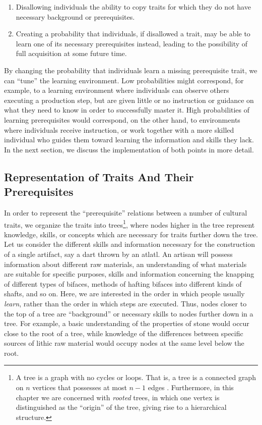 \documentclass[graybox,natbib]{svmult}
\begin{document}
\begin{enumerate}
\def\labelenumi{\arabic{enumi}.}
\itemsep1pt\parskip0pt
\item
  Disallowing individuals the ability to copy traits for which they
  do not have necessary background or prerequisites.
\item
  Creating a probability that individuals, if disallowed a trait, may be
  able to learn one of its necessary prerequisites instead, leading to
  the possibility of full acquisition at some future time.
\end{enumerate}

By changing the probability that individuals learn a missing
prerequisite trait, we can ``tune'' the learning environment. Low
probabilities might correspond, for example, to a learning environment
where individuals can observe others executing a production step, but
are given little or no instruction or guidance on what they need to know
in order to successfully master it. High probabilities of learning
prerequisites would correspond, on the other hand, to environments where
individuals receive instruction, or work together with a more skilled
individual who guides them toward learning the information and skills
they lack. In the next section, we discuss the implementation of both
points in more detail.

\subsection{Representation of Traits And Their
Prerequisites}\label{representation-of-traits-and-their-prerequisites}

In order to represent the ``prerequisite'' relations between a number of
cultural traits, we organize the traits into trees\footnote{A tree is a
  graph with no cycles or loops. That is, a tree is a connected graph on
  $n$ vertices that possesses at most $n-1$ edges
  \citep{diestel2010graph}. Furthermore, in this chapter we are
  concerned with \emph{rooted} trees, in which one vertex is
  distinguished as the ``origin'' of the tree, giving rise to a
  hierarchical structure.}, where nodes higher in the tree represent
knowledge, skills, or concepts which are necessary for traits further
down the tree. Let us consider the different skills and information
necessary for the construction of a single artifact, say a dart thrown
by an atlatl. An artisan will possess information about different raw
materials, an understanding of what materials are suitable for specific
purposes, skills and information concerning the knapping of different
types of bifaces, methods of hafting bifaces into different kinds of
shafts, and so on. Here, we are interested in the order in which people
usually \emph{learn}, rather than the order in which steps are executed.
Thus, nodes closer to the top of a tree are ``background'' or necessary
skills to nodes further down in a tree. For example, a basic
understanding of the properties of stone would occur close to the root
of a tree, while knowledge of the differences between specific sources
of lithic raw material would occupy nodes at the same level below the
root.
\end{document}
